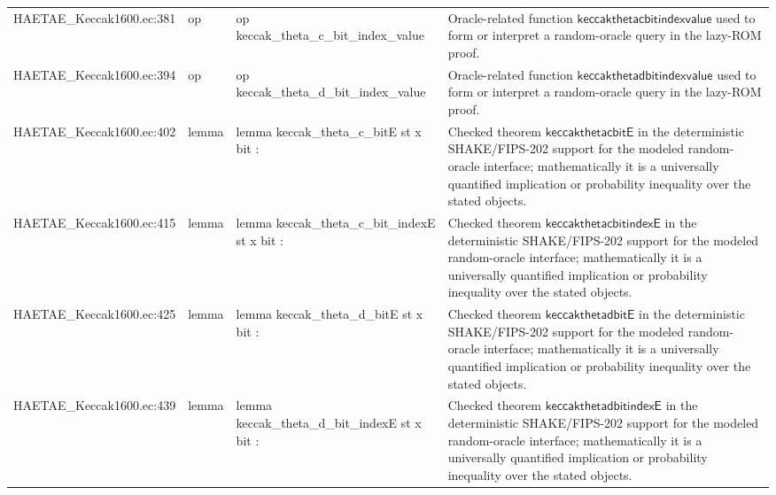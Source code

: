 \documentclass[10pt]{article}
\begin{document}
\begin{longtable}{L{0.11\textwidth}L{0.055\textwidth}L{0.385\textwidth}L{0.41\textwidth}}
HAETAE\_\allowbreak{}Keccak1600.\allowbreak{}ec:\allowbreak{}381 & op & {\ttfamily\scriptsize op keccak\_\allowbreak{}theta\_\allowbreak{}c\_\allowbreak{}bit\_\allowbreak{}index\_\allowbreak{}value} & Oracle-related function $\mathsf{keccakthetacbitindexvalue}$ used to form or interpret a random-oracle query in the lazy-ROM proof. \\
HAETAE\_\allowbreak{}Keccak1600.\allowbreak{}ec:\allowbreak{}394 & op & {\ttfamily\scriptsize op keccak\_\allowbreak{}theta\_\allowbreak{}d\_\allowbreak{}bit\_\allowbreak{}index\_\allowbreak{}value} & Oracle-related function $\mathsf{keccakthetadbitindexvalue}$ used to form or interpret a random-oracle query in the lazy-ROM proof. \\
HAETAE\_\allowbreak{}Keccak1600.\allowbreak{}ec:\allowbreak{}402 & lemma & {\ttfamily\scriptsize lemma keccak\_\allowbreak{}theta\_\allowbreak{}c\_\allowbreak{}bitE st x bit :} & Checked theorem $\mathsf{keccakthetacbitE}$ in the deterministic SHAKE/FIPS-202 support for the modeled random-oracle interface; mathematically it is a universally quantified implication or probability inequality over the stated objects. \\
HAETAE\_\allowbreak{}Keccak1600.\allowbreak{}ec:\allowbreak{}415 & lemma & {\ttfamily\scriptsize lemma keccak\_\allowbreak{}theta\_\allowbreak{}c\_\allowbreak{}bit\_\allowbreak{}indexE st x bit :} & Checked theorem $\mathsf{keccakthetacbitindexE}$ in the deterministic SHAKE/FIPS-202 support for the modeled random-oracle interface; mathematically it is a universally quantified implication or probability inequality over the stated objects. \\
HAETAE\_\allowbreak{}Keccak1600.\allowbreak{}ec:\allowbreak{}425 & lemma & {\ttfamily\scriptsize lemma keccak\_\allowbreak{}theta\_\allowbreak{}d\_\allowbreak{}bitE st x bit :} & Checked theorem $\mathsf{keccakthetadbitE}$ in the deterministic SHAKE/FIPS-202 support for the modeled random-oracle interface; mathematically it is a universally quantified implication or probability inequality over the stated objects. \\
HAETAE\_\allowbreak{}Keccak1600.\allowbreak{}ec:\allowbreak{}439 & lemma & {\ttfamily\scriptsize lemma keccak\_\allowbreak{}theta\_\allowbreak{}d\_\allowbreak{}bit\_\allowbreak{}indexE st x bit :} & Checked theorem $\mathsf{keccakthetadbitindexE}$ in the deterministic SHAKE/FIPS-202 support for the modeled random-oracle interface; mathematically it is a universally quantified implication or probability inequality over the stated objects. \\

\end{longtable}
\end{document}
